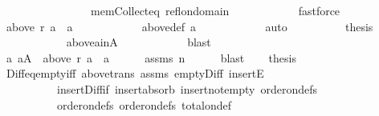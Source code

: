 \begin{isabellebody}
\ \ \ \ \ \ \ \ \ \ \ \ \ \ \ \ mem{\isacharunderscore}{\kern0pt}Collect{\isacharunderscore}{\kern0pt}eq\ refl{\isacharunderscore}{\kern0pt}on{\isacharunderscore}{\kern0pt}domain\isanewline
\ \ \ \ \ \ \ \ \ \ \isamarkupfalse%
\ fastforce\isanewline
\ \ \ \ \ \ \ \ \isamarkupfalse%
\ \isamarkupfalse%
\ {\isachardoublequoteopen}above\ r\ a\ {\isacharequal}{\kern0pt}\ {\isacharbraceleft}{\kern0pt}a{\isacharbraceright}{\kern0pt}{\isachardoublequoteclose}\isanewline
\ \ \ \ \ \ \ \ \ \ \isamarkupfalse%
\ above{\isacharunderscore}{\kern0pt}def\ a\isanewline
\ \ \ \ \ \ \ \ \ \ \isamarkupfalse%
\ auto\isanewline
\ \ \ \ \ \ \ \ \isamarkupfalse%
\ {\isacharquery}{\kern0pt}thesis\isanewline
\ \ \ \ \ \ \ \ \ \ \isamarkupfalse%
\ above{\isacharunderscore}{\kern0pt}a{\isacharunderscore}{\kern0pt}in{\isacharunderscore}{\kern0pt}A\isanewline
\ \ \ \ \ \ \ \ \ \ \isamarkupfalse%
\ blast\isanewline
\ \ \ \ \ \ \isamarkupfalse%
\isanewline
\ \ \ \ \isamarkupfalse%
\isanewline
\ \ \isamarkupfalse%
\isanewline
\ \ \isamarkupfalse%
\ {\isachardoublequoteopen}{\isasymexists}a{\isachardot}{\kern0pt}\ a{\isasymin}A\ {\isasymand}\ above\ r\ a\ {\isacharequal}{\kern0pt}\ {\isacharbraceleft}{\kern0pt}a{\isacharbraceright}{\kern0pt}{\isachardoublequoteclose}\isanewline
\ \ \ \ \isamarkupfalse%
\ assms\ n\isanewline
\ \ \ \ \isamarkupfalse%
\ blast\isanewline
\ \ \isamarkupfalse%
\ {\isacharquery}{\kern0pt}thesis\isanewline
\ \ \ \ \isamarkupfalse%
\ Diff{\isacharunderscore}{\kern0pt}eq{\isacharunderscore}{\kern0pt}empty{\isacharunderscore}{\kern0pt}iff\ above{\isacharunderscore}{\kern0pt}trans\ assms{\isacharparenleft}{\kern0pt}{}{\isacharparenright}{\kern0pt}\ empty{\isacharunderscore}{\kern0pt}Diff\ insertE\isanewline
\ \ \ \ \ \ \ \ \ \ insert{\isacharunderscore}{\kern0pt}Diff{\isacharunderscore}{\kern0pt}if\ insert{\isacharunderscore}{\kern0pt}absorb\ insert{\isacharunderscore}{\kern0pt}not{\isacharunderscore}{\kern0pt}empty\ order{\isacharunderscore}{\kern0pt}on{\isacharunderscore}{\kern0pt}defs{\isacharparenleft}{\kern0pt}{}{\isacharparenright}{\kern0pt}\isanewline
\ \ \ \ \ \ \ \ \ \ order{\isacharunderscore}{\kern0pt}on{\isacharunderscore}{\kern0pt}defs{\isacharparenleft}{\kern0pt}{}{\isacharparenright}{\kern0pt}\ order{\isacharunderscore}{\kern0pt}on{\isacharunderscore}{\kern0pt}defs{\isacharparenleft}{\kern0pt}{}{\isacharparenright}{\kern0pt}\ total{\isacharunderscore}{\kern0pt}on{\isacharunderscore}{\kern0pt}def\isanewline

\end{isabellebody}

